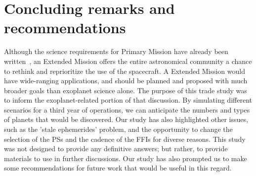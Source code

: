 \section{Concluding remarks and recommendations}
\label{sec:conclusions}

Although the science requirements for \tesss Primary Mission have already been
written~\citep{ricker_transiting_2014}, an Extended Mission offers the
entire astronomical community a chance to rethink and reprioritize the use of the spacecraft.
A \tess Extended Mission would have wide-ranging applications, and should be 
planned and proposed with much broader goals than exoplanet science alone. 
The purpose of this trade study was to inform the exoplanet-related portion of 
that discussion. By simulating different scenarios for a third year of 
operations, we can anticipate
the numbers and types of planets that would be discovered. Our study has also highlighted other issues,
such as the 'stale ephemerides' problem, and the opportunity to change the
selection of the PSs and the cadence of the FFIs for diverse reasons.
This study was not designed to provide any definitive answers; but rather,
to provide materials to use in further discussions.  Our study has also
prompted us to make
some recommendations for future work that would be useful in this regard.

